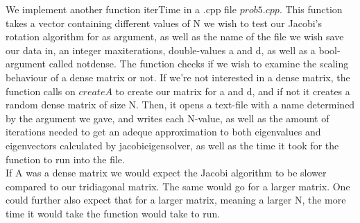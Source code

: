 \documentclass{article} %
\begin{document}
  We implement another function iterTime in a .cpp file $prob5.cpp$. This function takes a vector containing different values of 
  N we wish to test our Jacobi's rotation algorithm for as argument, as well as the name of the file we wish save our data in, an integer 
  maxiterations, double-values a and d, as well as a bool-argument called notdense. The function checks if we wish to examine the scaling
  behaviour of a dense matrix or not. If we're not interested in a dense matrix, the function calls on $createA$ to create our matrix
  for a and d, and if not it creates a random dense matrix of size N. Then, it opens a text-file with a name determined by the argument we gave,
  and writes each N-value, as well as the amount of iterations needed to get an adeque approximation to both eigenvalues and eigenvectors
  calculated by jacobieigensolver, as well as the time it took for the function to run into the file. \\

  If A was a dense matrix we would expect the Jacobi algorithm to be slower compared to our tridiagonal matrix. The same would go for
  a larger matrix. One could further also expect that for a larger matrix, meaning a larger N, the more time it would take the function 
  would take to run. 
\end{document}
